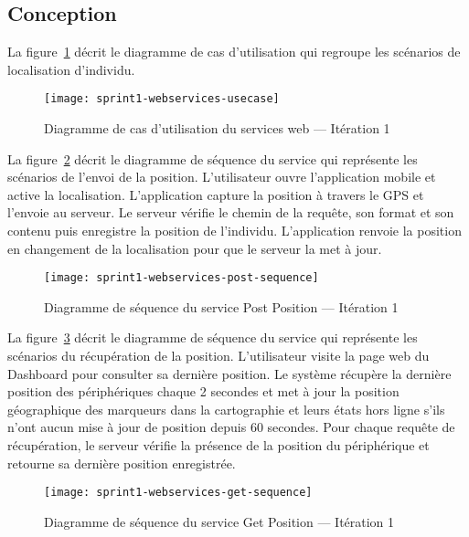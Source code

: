 \subsection{Conception}

La figure~\ref{fig:sprint1-webservices-usecase} décrit le diagramme
de cas d'utilisation qui regroupe les scénarios de localisation d'individu.

\begin{figure}[H]
    \centering
    \texttt{[image: sprint1-webservices-usecase]}
    \caption{Diagramme de cas d'utilisation du services web --- Itération 1}
\label{fig:sprint1-webservices-usecase}
\end{figure}

La figure~\ref{fig:sprint1-webservices-post-sequence} décrit le diagramme de
séquence du service  qui représente les scénarios de
l'envoi de la position. L'utilisateur ouvre l'application mobile et active la
localisation. L'application capture la position à travers le GPS et l'envoie au
serveur. Le serveur vérifie le chemin de la requête, son format et son contenu
puis enregistre la position de l'individu. L'application renvoie la position en
changement de la localisation pour que le serveur la met à jour.

\begin{figure}[H]
    \centering
    \texttt{[image: sprint1-webservices-post-sequence]}
    \caption{Diagramme de séquence du service Post Position --- Itération 1}
\label{fig:sprint1-webservices-post-sequence}
\end{figure}

La figure~\ref{fig:sprint1-webservices-get-sequence} décrit le diagramme de
séquence du service  qui représente les scénarios du
récupération de la position. L'utilisateur visite la page web du Dashboard pour
consulter sa dernière position.  Le système récupère la dernière position des
périphériques chaque 2 secondes et met à jour la position géographique des
marqueurs dans la cartographie et leurs états hors ligne s'ils n'ont aucun
mise à jour de position depuis 60 secondes. Pour chaque requête de
récupération, le serveur vérifie la présence de la position du périphérique et
retourne sa dernière position enregistrée.

\begin{figure}[H]
    \centering
    \texttt{[image: sprint1-webservices-get-sequence]}
    \caption{Diagramme de séquence du service Get Position --- Itération 1}
\label{fig:sprint1-webservices-get-sequence}
\end{figure}

